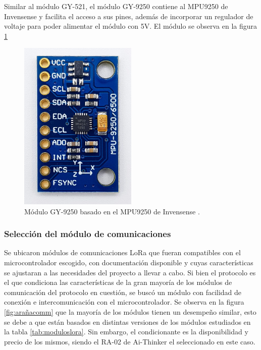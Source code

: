 Similar al módulo GY-521, el módulo GY-9250 contiene al MPU9250 de Invensense y facilita el acceso a sus pines, además de incorporar un regulador de voltaje para poder alimentar el módulo con 5V. El módulo se observa en la figura \ref{fig:mpu9250}

\begin{figure}[H]
    \centering
    \includegraphics[width = 0.5\textwidth]{imagenes/cap2_marcometod/MPU9250.jpeg}
    \caption{Módulo GY-9250 basado en el MPU9250 de Invensense \citep{mpu9250}.}
    \label{fig:mpu9250}
\end{figure}


\subsubsection{Selección del módulo de comunicaciones}

Se ubicaron módulos de comunicaciones LoRa que fueran compatibles con el microcontrolador escogido, con documentación disponible y cuyas características se ajustaran a las necesidades del proyecto a llevar a cabo. Si bien el protocolo es el que condiciona las características de la gran mayoría de los módulos de comunicación del protocolo en cuestión, se buscó un módulo con facilidad de conexión e intercomunicación con el microcontrolador. Se observa en la figura \ref{fig:arañacomm} que la mayoría de los módulos tienen un desempeño similar, esto se debe a que están basados en distintas versiones de los módulos estudiados en la tabla \ref{tab:moduloslora}. Sin embargo, el condicionante es la disponibilidad y precio de los mismos, siendo el RA-02 de Ai-Thinker el seleccionado en este caso.

